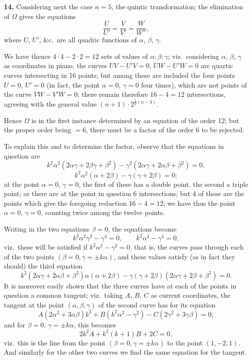 \documentclass[11pt,a4paper]{article}
\theoremstyle{plain}
\begin{document}
\medskip
\noindent\textbf{14.} Considering next the case $n = 5$, the quintic transformation; the elimination of $\Omega$ gives the equations
\[
\frac{U}{U'} = \frac{V}{V'} = \frac{W}{W''},
\]
where $U$, $U'$, \&c.\ are all quadric functions of $\alpha$, $\beta$, $\gamma$.

We have thence $4 \cdot 4 - 2 \cdot 2 = 12$ sets of values of $\alpha : \beta : \gamma$; viz.\ considering $\alpha$, $\beta$, $\gamma$ as coordinates in piano, the curves $UV - U'V = 0$, $UW - U'W = 0$ are quartic curves intersecting in 16 points; but among these are included the four points $U = 0$, $U' = 0$ (in fact, the point $\alpha = 0$, $\gamma = 0$ four times), which are not points of the curve $VW - V'W = 0$; there remain therefore $16 - 4 = 12$ intersections, agreeing with the general value $(n + 1) \cdot 2^{\frac{1}{2}(n-3)}$.

Hence $\Omega$ is in the first instance determined by an equation of the order 12; but the proper order being $= 6$, there must be a factor of the order 6 to be rejected.

To explain this and to determine the factor, observe that the equations in question are
\[
k^2\alpha^2(2\alpha\gamma + 2\beta\gamma + \beta^2) - \gamma^2(2\alpha\gamma + 2\alpha\beta + \beta^2) = 0,
\]
\[
k^2\alpha^2(\alpha + 2\beta) - \gamma(\gamma + 2\beta) = 0;
\]
at the point $\alpha = 0$, $\gamma = 0$, the first of these has a double point, the second a triple point; or there are at the point in question 6 intersections; but 4 of these are the points which give the foregoing reduction $16 - 4 = 12$; we have thus the point $\alpha = 0$, $\gamma = 0$, counting twice among the twelve points.

Writing in the two equations $\beta = 0$, the equations become
\[
k^2\alpha^2\gamma^2 - \gamma^4 = 0, \qquad k^2\alpha^4 - \gamma^4 = 0,
\]
viz.\ these will be satisfied if $k^2\alpha^2 - \gamma^2 = 0$, that is, the curves pass through each of the two points $(\beta = 0, \gamma = \pm k\alpha)$, and these values satisfy (as in fact they should) the third equation
\[
k^2(2\alpha\gamma + 2\alpha\beta + \beta^2)\alpha(\alpha + 2\beta) - \gamma(\gamma + 2\beta)(2\alpha\gamma + 2\beta + \beta^2) = 0.
\]
It is moreover easily shown that the three curves have at each of the points in question a common tangent; viz.\ taking $A$, $B$, $C$ as current coordinates, the tangent at the point $(\alpha, \beta, \gamma)$ of the second curve has for its equation
\[
A(2\alpha^2 + 3\alpha\beta)k^2 + B(k^2\alpha^2 - \gamma^2) - C(2\gamma^2 + 3\gamma\beta) = 0;
\]
and for $\beta = 0$, $\gamma = \pm k\alpha$, this becomes
\[
2k^2A + k^2(k + 1)B + 2C = 0,
\]
viz.\ this is the line from the point $(\beta = 0, \gamma = \pm k\alpha)$ to the point $(1, -2, 1)$. And similarly for the other two curves we find the same equation for the tangent.
\end{document}

